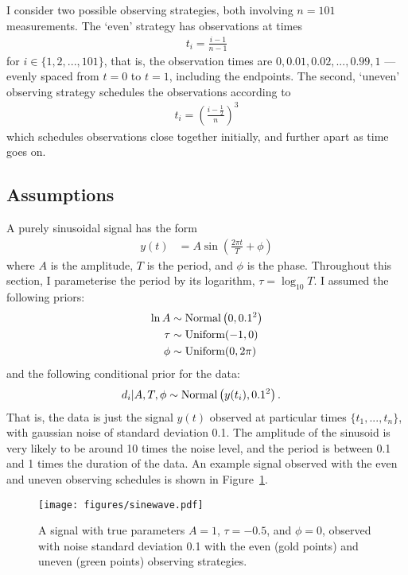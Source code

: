 \documentclass[entropy,article,accept,oneauthor,pdftex,10pt,a4paper]{mdpi}
\begin{document}
I consider two possible observing strategies, both involving
$n=101$ measurements. The `even' strategy has observations at times
\begin{align}
t_i = \frac{i-1}{n-1}
\end{align}
for $i \in \{1, 2, ..., 101\}$, that is, the observation times are
$0, 0.01, 0.02, ..., 0.99, 1$ ---
evenly spaced from $t=0$ to $t=1$, including the endpoints.
The second, `uneven' observing strategy schedules the observations
according to
\begin{align}
t_i = \left(\frac{i - \frac{1}{2}}{n}\right)^3
\end{align}
which schedules observations close together initially, and further apart
as time goes on.

\subsection{Assumptions}

A purely sinusoidal signal has the form
\begin{align}
y(t) &= A \sin \left(\frac{2\pi t}{T} + \phi\right)
\end{align}
where $A$ is the amplitude, $T$ is the period, and $\phi$ is the phase.
Throughout this section, I parameterise the period by its logarithm,
$\tau = \log_{10} T$. I assumed the following priors:
\begin{align}
\ln A   &\sim \textnormal{Normal}\left(0, 0.1^2\right)  \\
\tau    &\sim \textnormal{Uniform}(-1, 0)  \\
\phi    &\sim \textnormal{Uniform}(0, 2\pi)
\end{align}
and the following conditional prior for the data:
\begin{align}
d_i | A, T, \phi &\sim \textnormal{Normal}\left(y(t_i), 0.1^2\right).
\end{align}
That is, the data is just the signal $y(t)$ observed at particular times
$\{t_1, ..., t_n\}$, with gaussian noise of standard deviation 0.1.
The amplitude of the sinusoid is very likely to be around 10 times the
noise level, and the period is between 0.1 and 1 times the duration of
the data. An example signal observed with the even and uneven observing schedules
is shown in Figure~\ref{fig:sinewave}.

\begin{figure}[!ht]
\centering
\texttt{[image: figures/sinewave.pdf]}
\caption{A signal with true parameters $A=1$, $\tau=-0.5$, and
$\phi=0$, observed with noise standard deviation 0.1 with the
even (gold points) and uneven (green points) observing strategies.
\label{fig:sinewave}}
\end{figure}
\end{document}
